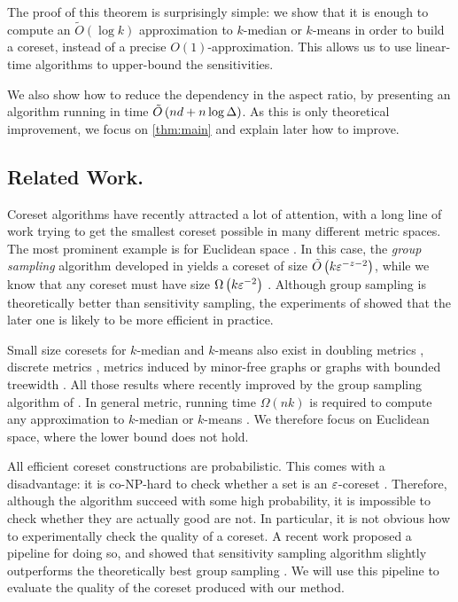 The proof of this theorem is surprisingly simple: we show that it is enough to compute an $\tilde O(\log k)$ approximation to $k$-median or $k$-means in order to build a coreset, instead of a precise $O(1)$-approximation. This allows us to use linear-time algorithms to upper-bound the sensitivities.

We also show how to reduce the dependency in the aspect ratio, by presenting an algorithm running in time $\tilde O\left( nd + n \log \Delta\right)$. As this is only theoretical improvement, we focus on \cref{thm:main} and explain later how to improve.


\subsection{Related Work.}

Coreset algorithms have recently attracted a lot of attention, with a long line of work trying to get the smallest coreset possible in many different metric spaces. The most prominent example is for Euclidean space \cite{BadoiuHI02, HaM04, Chen09, HuangV20, stoc22}. 
In this case, the \textit{group sampling} algorithm developed in \cite{stoc21, stoc22} yields a coreset of size $\tilde O\left( k \varepsilon^{-z-2}\right)$, while we know that any coreset must have size $\Omega \left( k\varepsilon^{-2}\right)$ \cite{stoc22}.
Although group sampling is theoretically better than sensitivity sampling, the experiments of \cite{chrisESA} showed that the later one is likely to be more efficient in practice.

Small size coresets for $k$-median and $k$-means also exist in doubling metrics \cite{huang2018varepsilon}, discrete metrics \cite{FeldmanL11}, metrics induced by minor-free graphs \cite{BravermanJKW21} or graphs with bounded treewidth \cite{baker2020coresets}. 
All those results where recently improved by the group sampling algorithm of \cite{stoc21}. 
In general metric, running time $\Omega(nk)$ is required to compute any approximation to $k$-median or $k$-means \cite{mettu2004optimal}. 
We therefore focus on Euclidean space, where the lower bound does not hold.


All efficient coreset constructions are probabilistic. This comes with a disadvantage: it is co-NP-hard to check whether a set is an $\varepsilon$-coreset \cite{chrisESA}. Therefore, although the algorithm succeed with some high probability, it is impossible to check whether they are actually good are not. 
In particular, it is not obvious how to experimentally check the quality of a coreset.
A recent work proposed a pipeline for doing so, and showed that sensitivity sampling algorithm slightly outperforms the theoretically best group sampling \cite{chrisESA}. 
We will use this pipeline to evaluate the quality of the coreset produced with our method.

